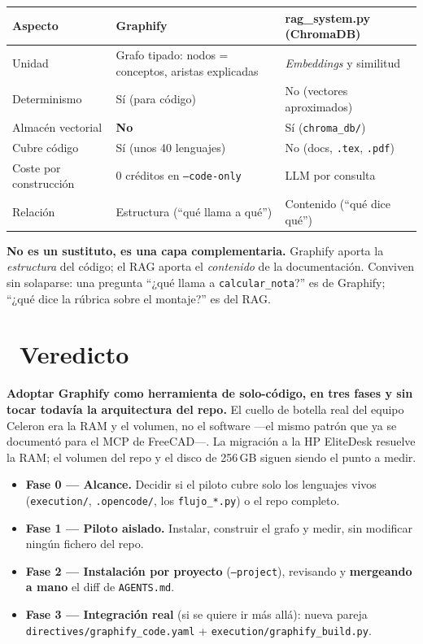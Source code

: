 \documentclass[11pt,a4paper]{article}
\newcommand{\iconotexto}[2]{\textcolor{cyanNeon}{\faIcon{#1}}~#2}
\begin{document}
\begin{longtable}{p{3.4cm} p{5.1cm} p{5.1cm}}
\toprule
\textbf{Aspecto} & \textbf{Graphify} & \textbf{rag\_system.py (ChromaDB)} \\
\midrule
\endhead
\bottomrule
\endlastfoot
Unidad & Grafo tipado: nodos = conceptos, aristas explicadas & \emph{Embeddings} y similitud \\
Determinismo & Sí (para código) & No (vectores aproximados) \\
Almacén vectorial & \textbf{No} & Sí (\texttt{chroma\_db/}) \\
Cubre código & Sí (unos 40 lenguajes) & No (docs, \texttt{.tex}, \texttt{.pdf}) \\
Coste por construcción & 0 créditos en \texttt{--code-only} & LLM por consulta \\
Relación & Estructura (``qué llama a qué'') & Contenido (``qué dice qué'') \\
\end{longtable}

\begin{cajaConcepto}
\textbf{No es un sustituto, es una capa complementaria.} Graphify aporta la
\emph{estructura} del código; el RAG aporta el \emph{contenido} de la documentación.
Conviven sin solaparse: una pregunta ``¿qué llama a \texttt{calcular\_nota}?'' es de
Graphify; ``¿qué dice la rúbrica sobre el montaje?'' es del RAG.
\end{cajaConcepto}

\section[Veredicto]{\iconotexto{gavel}{Veredicto}}

\begin{tcolorbox}[cajaRecomendacion, title={\faIcon{clipboard-check}~Recomendación}]
\textbf{Adoptar Graphify como herramienta de solo-código, en tres fases y sin tocar
todavía la arquitectura del repo.} El cuello de botella real del equipo Celeron era la
RAM y el volumen, no el software ---el mismo patrón que ya se documentó para el MCP de
FreeCAD---. La migración a la HP EliteDesk resuelve la RAM; el volumen del repo y el
disco de 256\,GB siguen siendo el punto a medir.
\end{tcolorbox}

\begin{itemize}[leftmargin=1.4em]
    \item \textbf{Fase 0 --- Alcance.} Decidir si el piloto cubre solo los lenguajes vivos
    (\texttt{execution/}, \texttt{.opencode/}, los \texttt{flujo\_*.py}) o el repo completo.
    \item \textbf{Fase 1 --- Piloto aislado.} Instalar, construir el grafo y medir, sin
    modificar ningún fichero del repo.
    \item \textbf{Fase 2 --- Instalación por proyecto} (\texttt{--project}), revisando y
    \textbf{mergeando a mano} el diff de \texttt{AGENTS.md}.
    \item \textbf{Fase 3 --- Integración real} (si se quiere ir más allá): nueva pareja
    \texttt{directives/graphify\_code.yaml} + \texttt{execution/graphify\_build.py}.
\end{itemize}
\end{document}
